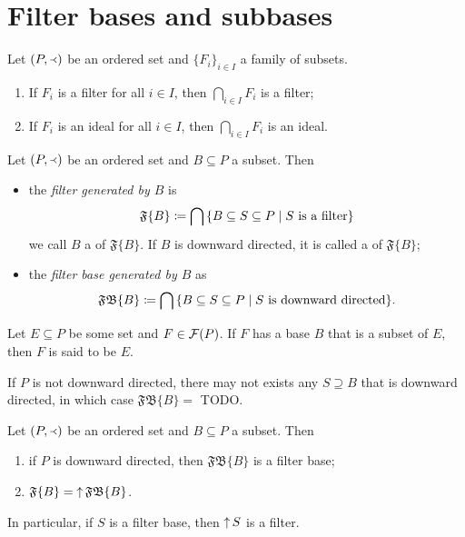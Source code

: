 \section{Filter bases and subbases}

\begin{lemma}
Let $\sSet{P,\Yleft}$ be an ordered set and $\{F_i\}_{i\in I}$ a family of subsets.
\begin{enumerate}
\item If $F_i$ is a filter for all $i\in I$, then $\bigcap_{i\in I}F_i$ is a filter;
\item If $F_i$ is an ideal for all $i\in I$, then $\bigcap_{i\in I}F_i$ is an ideal.
\end{enumerate}
\end{lemma}

\begin{definition}
Let $\sSet{P,\Yleft}$ be an ordered set and $B\subseteq P$ a subset. Then
\begin{itemize}
\item the \emph{filter generated by $B$} is
\[ \mathfrak{F}\{B\} \defeq \bigcap\setbuilder{B \subseteq S\subseteq P}{\text{$S$ is a filter}} \]
we call $B$ a  of $\mathfrak{F}\{B\}$. If $B$ is downward directed, it is called a  of $\mathfrak{F}\{B\}$;
\item the \emph{filter base generated by $B$} as
\[ \mathfrak{FB}\{B\} \defeq \bigcap\setbuilder{B \subseteq S\subseteq P}{\text{$S$ is downward directed}}. \]
\end{itemize}
Let $E\subseteq P$ be some set and $F\in \operatorname{\mathcal{F}}(P)$. If $F$ has a base $B$ that is a subset of $E$, then $F$ is said to be  $E$.  
\end{definition}

If $P$ is not downward directed, there may not exists any $S \supseteq B$ that is downward directed, in which case $\mathfrak{FB}\{B\} =$ TODO.

\begin{proposition}
Let $\sSet{P,\Yleft}$ be an ordered set and $B\subseteq P$ a subset. Then
\begin{enumerate}
\item if $P$ is downward directed, then $\mathfrak{FB}\{B\}$ is a filter base;
\item $\mathfrak{F}\{B\} = \operatorname{\uparrow}\mathfrak{FB}\{B\}$.
\end{enumerate}
\end{proposition}
In particular, if $S$ is a filter base, then $\operatorname{\uparrow} S$ is a filter.


